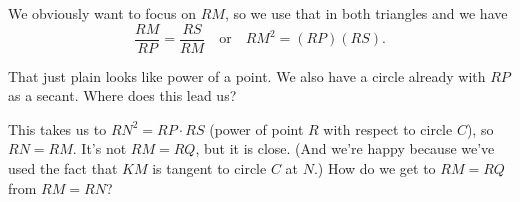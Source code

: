 














We obviously want to focus on $RM$, so we use that in both triangles and we have
$$ \dfrac{RM}{RP} = \dfrac{RS}{RM} \quad \text{or} \quad RM^2 = (RP)(RS). $$

That just plain looks like power of a point. We also have a circle already with $RP$ as a secant. Where does this lead us?




This takes us to $RN^2 = RP \cdot RS$ (power of point $R$ with respect to circle $C$), so $RN = RM.$ It's not $RM = RQ$, but it is close. (And we're happy because we've used the fact that $KM$ is tangent to circle $C$ at $N$.) How do we get to $RM = RQ$ from $RM = RN$?

